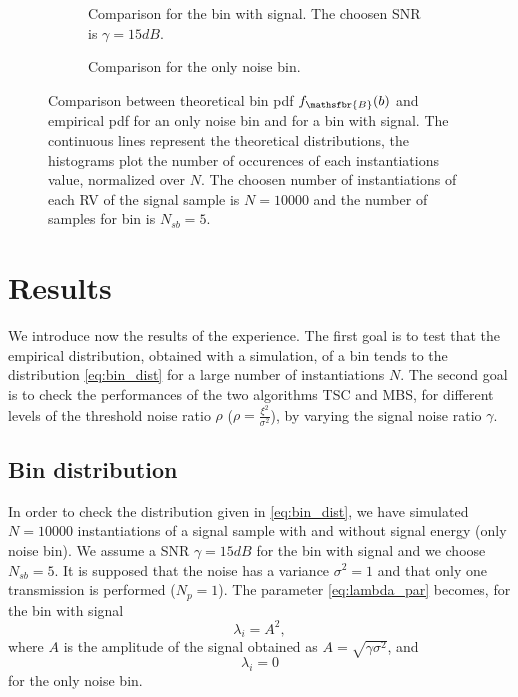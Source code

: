 \documentclass[%
    twoside, 
    a4paper
    ]{article}
\DeclareRobustCommand{\msf}[1]{%
  \ifcat\noexpand#1\relax\msfgreek{#1}\else\mathsfbr{#1}\fi%
}
\begin{document}
  \begin{figure}[t]
    \begin{subfigure}[t]{0.49\linewidth}
      
      \caption{Comparison for the bin with signal. The choosen SNR is $\gamma = 15 \si{dB}$.}
      \label{fig:signal_bin}
    \end{subfigure}
    \begin{subfigure}[t]{0.49\linewidth}
      
      \caption{Comparison for the only noise bin.}
      \label{fig:noise_bin}
    \end{subfigure}
    \caption{Comparison between theoretical bin pdf $f_{\msf{B}}(b)$ and empirical pdf for an only noise 
    bin and for a bin with signal. The continuous lines represent the theoretical distributions, the histograms
    plot the number of occurences of each instantiations value, normalized over $N$. The choosen number 
    of instantiations of each RV of the signal sample is $N=10000$ and the number of samples for bin is 
    $N_{sb} = 5$.}
  \end{figure}
\section{Results}
  We introduce now the results of the experience. The first goal is to test that the empirical distribution,
  obtained with a simulation, of a bin tends to the distribution \ref{eq:bin_dist} for a large number of 
  instantiations $N$. The second goal is to check the performances of the two algorithms TSC and MBS, for different
  levels of the threshold noise ratio $\rho$ ($\rho = \frac{\xi^2}{\sigma^2}$), by varying the signal noise ratio
  $\gamma$.
  
  
  \subsection{Bin distribution}
    
    In order to check the distribution given in \ref{eq:bin_dist}, we have simulated $N=10000$ instantiations of a signal sample
    with and without signal energy (only noise bin). We assume a SNR $\gamma = 15 \si{dB}$ for the bin with signal 
    and we choose $N_{sb}=5$.
    It is supposed that the noise has a variance $\sigma^2 = 1$ and that only one transmission is performed
    ($N_p = 1$).
    The parameter \ref{eq:lambda_par} becomes, for the bin with signal
    \begin{equation}
      \lambda_i = A^2,
      \label{eq:lambda_signal}
    \end{equation}
    where $A$ is the amplitude of the signal obtained as $A = \sqrt{\gamma \sigma^2}$, and 
    \begin{equation}
      \lambda_i = 0
      \label{eq:lambda_noise}
    \end{equation}
    for the only noise bin.
\end{document}
